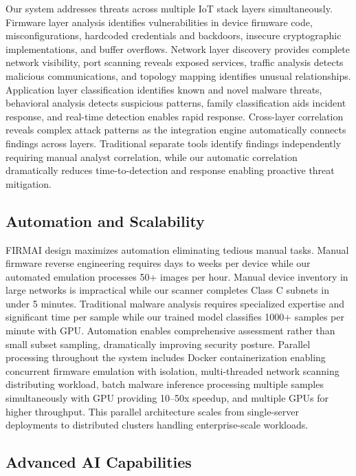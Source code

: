 Our system addresses threats across multiple IoT stack layers simultaneously. Firmware layer analysis identifies vulnerabilities in device firmware code, misconfigurations, hardcoded credentials and backdoors, insecure cryptographic implementations, and buffer overflows. Network layer discovery provides complete network visibility, port scanning reveals exposed services, traffic analysis detects malicious communications, and topology mapping identifies unusual relationships. Application layer classification identifies known and novel malware threats, behavioral analysis detects suspicious patterns, family classification aids incident response, and real-time detection enables rapid response. Cross-layer correlation reveals complex attack patterns as the integration engine automatically connects findings across layers. Traditional separate tools identify findings independently requiring manual analyst correlation, while our automatic correlation dramatically reduces time-to-detection and response enabling proactive threat mitigation.

\subsection{Automation and Scalability}

FIRMAI design maximizes automation eliminating tedious manual tasks. Manual firmware reverse engineering requires days to weeks per device while our automated emulation processes 50+ images per hour. Manual device inventory in large networks is impractical while our scanner completes Class C subnets in under 5 minutes. Traditional malware analysis requires specialized expertise and significant time per sample while our trained model classifies 1000+ samples per minute with GPU. Automation enables comprehensive assessment rather than small subset sampling, dramatically improving security posture. Parallel processing throughout the system includes Docker containerization enabling concurrent firmware emulation with isolation, multi-threaded network scanning distributing workload, batch malware inference processing multiple samples simultaneously with GPU providing 10--50x speedup, and multiple GPUs for higher throughput. This parallel architecture scales from single-server deployments to distributed clusters handling enterprise-scale workloads.

\subsection{Advanced AI Capabilities}

